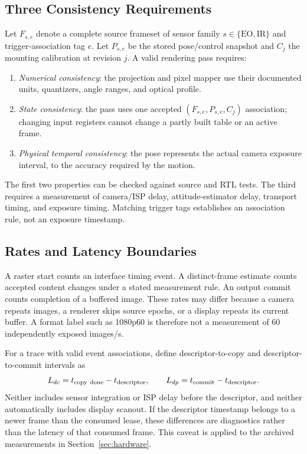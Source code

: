 \subsection{Three Consistency Requirements}
Let $F_{s,e}$ denote a complete source frameset of sensor family $s\in\{\mathrm{EO},\mathrm{IR}\}$ and trigger-association tag $e$. Let $P_{s,e}$ be the stored pose/control snapshot and $C_j$ the mounting calibration at revision $j$. A valid rendering pass requires:
\begin{enumerate}
\item \emph{Numerical consistency}: the projection and pixel mapper use their documented units, quantizers, angle ranges, and optical profile.
\item \emph{State consistency}: the pass uses one accepted $(F_{s,e},P_{s,e},C_j)$ association; changing input registers cannot change a partly built table or an active frame.
\item \emph{Physical temporal consistency}: the pose represents the actual camera exposure interval, to the accuracy required by the motion.
\end{enumerate}
The first two properties can be checked against source and RTL tests. The third requires a measurement of camera/ISP delay, attitude-estimator delay, transport timing, and exposure timing. Matching trigger tags establishes an association rule, not an exposure timestamp.

\subsection{Rates and Latency Boundaries}
A raster start counts an interface timing event. A distinct-frame estimate counts accepted content changes under a stated measurement rule. An output commit counts completion of a buffered image. These rates may differ because a camera repeats images, a renderer skips source epochs, or a display repeats its current buffer. A format label such as 1080p60 is therefore not a measurement of 60 independently exposed images/s.

For a trace with valid event associations, define descriptor-to-copy and descriptor-to-commit intervals as
\begin{equation}
 L_{dc}=t_{\rm copy\ done}-t_{\rm descriptor},\qquad
 L_{dp}=t_{\rm commit}-t_{\rm descriptor}.
 \label{eq:latencybounds}
\end{equation}
Neither includes sensor integration or ISP delay before the descriptor, and neither automatically includes display scanout. If the descriptor timestamp belongs to a newer frame than the consumed lease, these differences are diagnostics rather than the latency of that consumed frame. This caveat is applied to the archived measurements in Section~\ref{sec:hardware}.

